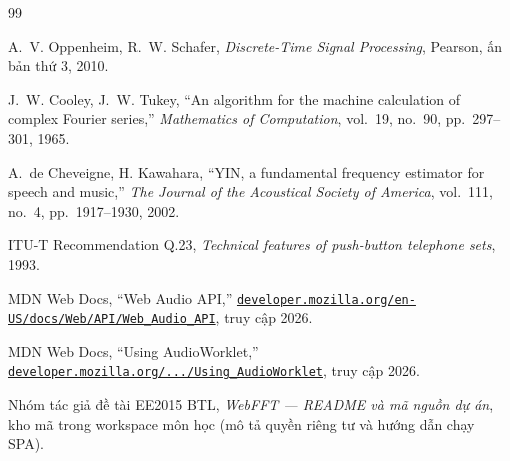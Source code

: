 \begin{thebibliography}{99}

	A.~V. Oppenheim, R.~W. Schafer,
	\textit{Discrete-Time Signal Processing},
	Pearson, ấn bản thứ 3, 2010.

	J.~W. Cooley, J.~W. Tukey,
	``An algorithm for the machine calculation of complex Fourier series,''
	\textit{Mathematics of Computation}, vol.~19, no.~90, pp.~297--301, 1965.

	A.~de Cheveigne, H. Kawahara,
	``YIN, a fundamental frequency estimator for speech and music,''
	\textit{The Journal of the Acoustical Society of America}, vol.~111, no.~4, pp.~1917--1930, 2002.

	ITU-T Recommendation Q.23,
	\textit{Technical features of push-button telephone sets},
	1993.

	MDN Web Docs,
	``Web Audio API,''
	\href{https://developer.mozilla.org/en-US/docs/Web/API/Web_Audio_API}{\texttt{developer.mozilla.org/en-US/docs/Web/API/Web\_Audio\_API}},
	truy cập 2026.

	MDN Web Docs,
	``Using AudioWorklet,''
	\href{https://developer.mozilla.org/en-US/docs/Web/API/Web_Audio_API/Using_AudioWorklet}{\texttt{developer.mozilla.org/.../Using\_AudioWorklet}},
	truy cập 2026.

	Nhóm tác giả đề tài EE2015 BTL,
	\textit{WebFFT --- README và mã nguồn dự án},
	kho mã trong workspace môn học (mô tả quyền riêng tư và hướng dẫn chạy SPA).

\end{thebibliography}
